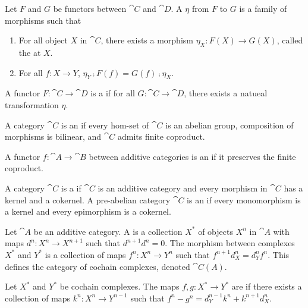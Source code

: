 \begin{definition}
    Let $F$ and $G$ be functors between $\cat{C}$ and $\cat{D}$. A  $\eta$ from $F$ to $G$ is a family of morphisms such that
    \begin{enumerate}
        \item For all object $X$ in $\cat{C}$, there exists a morphism ${\eta}_{X}:F(X)\to G(X)$, called the  at $X$.
        \item For all $f:X\to Y$, ${\eta}_{Y}\comp F(f)=G(f)\comp{\eta}_{X}$.
    \end{enumerate}
    A functor $F:\cat{C}\to\cat{D}$ is a  if for all $G:\cat{C}\to\cat{D}$, there exists a natueal transformation $\eta$.
\end{definition}
\begin{definition}
    A category $\cat{C}$ is an  if every hom-set of $\cat{C}$ is an abelian group, composition of morphisms is bilinear, and $\cat{C}$ admits finite coproduct.
\end{definition}
\begin{definition}
    A functor $f:\cat{A}\to\cat{B}$ between additive categories is an  if it preserves the finite coproduct.
\end{definition}
\begin{definition}
    A category $\cat{C}$ is a  if $\cat{C}$ is an additive category and every morphism in $\cat{C}$ has a kernel and a cokernel. A pre-abelian category $\cat{C}$ is an  if every monomorphism is a kernel and every epimorphism is a cokernel.
\end{definition}
\begin{definition}
    Let $\cat{A}$ be an additive category. A  is a collection ${X}^{*}$ of objects ${X}^{n}$ in $\cat{A}$ with maps ${d}^{n}:{X}^{n}\to{X}^{n+1}$ such that ${d}^{n+1}{d}^{n}=0$. The morphism between complexes ${X}^{*}$ and ${Y}^{*}$ is a collection of maps ${f}^{n}:{X}^{n}\to{Y}^{n}$ such that ${f}^{n+1}{d}_{X}^{n}={d}_{Y}^{n}{f}^{n}$. This defines the category of cochain complexes, denoted $\cat{C(A)}$.
\end{definition}
\begin{definition}
    Let ${X}^{*}$ and ${Y}^{*}$ be cochain complexes. The maps $f,g:{X}^{*}\to{Y}^{*}$ are  if there exists a collection of maps ${k}^{n}:{X}^{n}\to{Y}^{n-1}$ such that ${f}^{n}-{g}^{n}={d}_{Y}^{n-1}{k}^{n}+{k}^{n+1}{d}_{X}^{n}$.
\end{definition}
